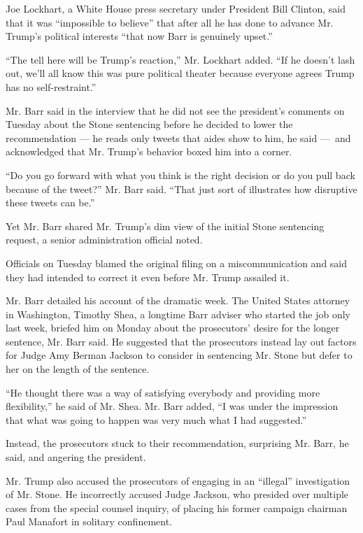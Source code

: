 Joe Lockhart, a White House press secretary under President Bill
Clinton, said that it was ``impossible to believe'' that after all he
has done to advance Mr. Trump's political interests ``that now Barr is
genuinely upset.''

``The tell here will be Trump's reaction,'' Mr. Lockhart added. ``If he
doesn't lash out, we'll all know this was pure political theater because
everyone agrees Trump has no self-restraint.''

Mr. Barr said in the interview that he did not see the president's
comments on Tuesday about the Stone sentencing before he decided to
lower the recommendation --- he reads only tweets that aides show to
him, he said ---~and acknowledged that Mr. Trump's behavior boxed him
into a corner.

``Do you go forward with what you think is the right decision or do you
pull back because of the tweet?'' Mr. Barr said. ``That just sort of
illustrates how disruptive these tweets can be.''

Yet Mr. Barr shared Mr. Trump's dim view of the initial Stone sentencing
request, a senior administration official noted.

Officials on Tuesday blamed the original filing on a miscommunication
and said they had intended to correct it even before Mr. Trump assailed
it.

Mr. Barr detailed his account of the dramatic week. The United States
attorney in Washington, Timothy Shea, a longtime Barr adviser who
started the job only last week, briefed him on Monday about the
prosecutors' desire for the longer sentence, Mr. Barr said. He suggested
that the prosecutors instead lay out factors for Judge Amy Berman
Jackson to consider in sentencing Mr. Stone but defer to her on the
length of the sentence.

``He thought there was a way of satisfying everybody and providing more
flexibility,'' he said of Mr. Shea. Mr. Barr added, ``I was under the
impression that what was going to happen was very much what I had
suggested.''

Instead, the prosecutors stuck to their recommendation, surprising Mr.
Barr, he said, and angering the president.

Mr. Trump also accused the prosecutors of engaging in an ``illegal''
investigation of Mr. Stone. He incorrectly accused Judge Jackson, who
presided over multiple cases from the special counsel inquiry, of
placing his former campaign chairman Paul Manafort in solitary
confinement.

